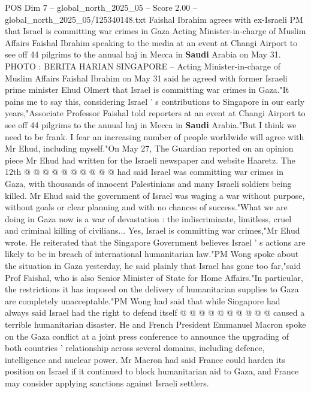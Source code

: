\begin{textsample}{POS Dim 7 – global\_north\_2025\_05 – Score 2.00 – global\_north\_2025\_05/125340148.txt}  \label{ex:f7_pos_342}
Faishal Ibrahim agrees with ex-Israeli PM that Israel is committing war crimes in Gaza Acting Minister-in-charge of Muslim Affairs Faishal Ibrahim speaking to the media at an event at Changi Airport to see off 44 pilgrims to the annual haj in Mecca in \textbf{Saudi} Arabia on May 31.
PHOTO : BERITA HARIAN SINGAPORE -- Acting Minister-in-charge of Muslim Affairs Faishal Ibrahim on May 31 said he agreed with former Israeli prime minister Ehud Olmert that Israel is committing war crimes in Gaza."It pains me to say this, considering Israel ' s contributions to Singapore in our early years,"Associate Professor Faishal told reporters at an event at Changi Airport to see off 44 pilgrims to the annual haj in Mecca in \textbf{Saudi} Arabia."But I think we need to be frank.
I fear an increasing number of people worldwide will agree with Mr Ehud, including myself."On May 27, The Guardian reported on an opinion piece Mr Ehud had written for the Israeli newspaper and website Haaretz.
The 12th @ @ @ @ @ @ @ @ @ @ had said Israel was committing war crimes in Gaza, with thousands of innocent Palestinians and many Israeli soldiers being killed.
Mr Ehud said the government of Israel was waging a war without purpose, without goals or clear planning and with no chances of success."What we are doing in Gaza now is a war of devastation : the indiscriminate, limitless, cruel and criminal killing of civilians...
Yes, Israel is committing war crimes,"Mr Ehud wrote.
He reiterated that the Singapore Government believes Israel ' s actions are likely to be in breach of international humanitarian law."PM Wong spoke about the situation in Gaza yesterday, he said plainly that Israel has gone too far,"said Prof Faishal, who is also Senior Minister of State for Home Affairs."In particular, the restrictions it has imposed on the delivery of humanitarian supplies to Gaza are completely unacceptable."PM Wong had said that while Singapore had always said Israel had the right to defend itself @ @ @ @ @ @ @ @ @ @ caused a terrible humanitarian disaster.
He and French President Emmanuel Macron spoke on the Gaza conflict at a joint press conference to announce the upgrading of both countries ' relationship across several domains, including defence, intelligence and nuclear power.
Mr Macron had said France could harden its position on Israel if it continued to block humanitarian aid to Gaza, and France may consider applying sanctions against Israeli settlers.

\end{textsample}
